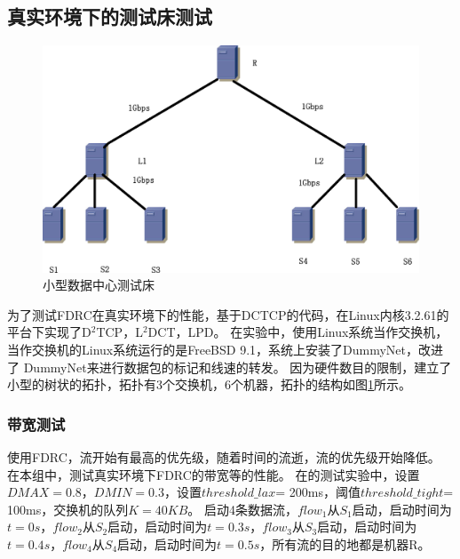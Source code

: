 \subsection{真实环境下的测试床测试}
\begin{figure}[H] 
  \centering
  \includegraphics[width=0.8\columnwidth]{figures/FDRC/evaluation/Realtest/testbed.eps}
  \caption{小型数据中心测试床}
\label{fdrc-testbed-fig}
\end{figure}
为了测试FDRC在真实环境下的性能，基于DCTCP的代码\cite{DCTCPcode}，在Linux内核3.2.61的平台下实现了D$^2$TCP，L$^2$DCT，LPD。
在实验中，使用Linux系统当作交换机，当作交换机的Linux系统运行的是FreeBSD 9.1，系统上安装了DummyNet\cite{dummynet}，改进了
DummyNet来进行数据包的标记和线速的转发。
因为硬件数目的限制，建立了小型的树状的拓扑，拓扑有3个交换机，6个机器，拓扑的结构如图\ref{fdrc-testbed-fig}所示。

\subsubsection{带宽测试}
使用FDRC，流开始有最高的优先级，随着时间的流逝，流的优先级开始降低。
在本组中，测试真实环境下FDRC的带宽等的性能。
在的测试实验中，设置$DMAX=0.8$，$DMIN=0.3$，设置$threshold\_lax$= 200ms，阈值$threshold\_tight$= 100ms，交换机的队列$K=40KB$。
启动4条数据流，$flow_1$从$S_1$启动，启动时间为$t=0s$，$flow_2$从$S_2$启动，启动时间为$t=0.3s$，$flow_3$从$S_3$启动，启动时间为$t=0.4s$，$flow_4$从$S_4$启动，启动时间为$t=0.5s$，所有流的目的地都是机器R。

